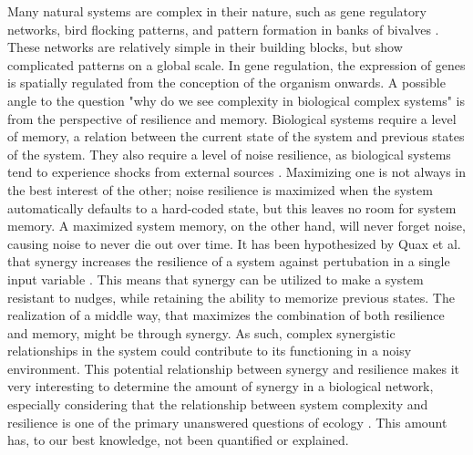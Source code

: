 \documentclass[../main.tex]{subfiles}
\begin{document}
Many natural systems are complex in their nature, such as gene regulatory networks, bird flocking patterns, and pattern formation in banks of bivalves \cite{}.
These networks are relatively simple in their building blocks, but show complicated patterns on a global scale.
In gene regulation, the expression of genes is spatially regulated from the conception of the organism onwards.
A possible angle to the question "why do we see  complexity in biological complex systems" is from the perspective of resilience and memory.
Biological systems require a level of memory, a relation between the current state of the system and previous states of the system. 
They also require a level of noise resilience, as biological systems tend to experience shocks from external sources \cite{peixoto2012emergence}.
Maximizing one is not always in the best interest of the other; noise resilience is maximized when the system automatically defaults to a hard-coded state, but this leaves no room for system memory.
A maximized system memory, on the other hand, will never forget noise, causing noise to never die out over time.
It has been hypothesized by Quax et al. that synergy increases the resilience of a system against pertubation in a single input variable \cite{quax2017quantifying}.
This means that synergy can be utilized to make a system resistant to nudges, while retaining the ability to memorize previous states.
The realization of a middle way, that maximizes the combination of both resilience and memory, might be through synergy.
As such, complex synergistic relationships in the system could contribute to its functioning in a noisy environment.
This potential relationship between synergy and resilience makes it very interesting to determine the amount of synergy in a biological network, especially considering that the relationship between system complexity and resilience is one of the primary unanswered questions of ecology \cite{}.
This amount has, to our best knowledge, not been quantified or explained.
\end{document}
